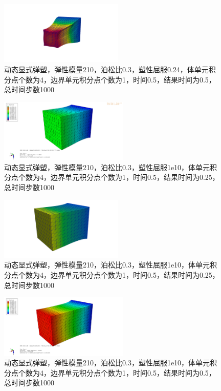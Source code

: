 \begin{figure}[!htbp]
  \centering
  \includegraphics[height=3cm]{fig/4/4.1.5/4-1.png}
  \caption{动态显式弹塑，弹性模量210，泊松比0.3，塑性屈服0.24，体单元积分点个数为4，边界单元积分点个数为1，时间0.5，结果时间为0.5，总时间步数1000}
  \label{fig:4.1.4:4}
\end{figure}

\begin{figure}[!htbp]
  \centering
  \includegraphics[height=3cm]{fig/4/4.1.5/5.png}
  \caption{动态显式弹塑，弹性模量210，泊松比0.3，塑性屈服1e10，体单元积分点个数为4，边界单元积分点个数为1，时间0.5，结果时间为0.25，总时间步数1000}
  \label{fig:4.1.4:4}
\end{figure}

\begin{figure}[!htbp]
  \centering
  \includegraphics[height=3cm]{fig/4/4.1.5/5-1.png}
  \caption{动态显式弹塑，弹性模量210，泊松比0.3，塑性屈服1e10，体单元积分点个数为4，边界单元积分点个数为1，时间0.5，结果时间为0.25，总时间步数1000}
  \label{fig:4.1.4:4}
\end{figure}

\begin{figure}[!htbp]
  \centering
  \includegraphics[height=3cm]{fig/4/4.1.5/6.png}
  \caption{动态显式弹塑，弹性模量210，泊松比0.3，塑性屈服1e10，体单元积分点个数为4，边界单元积分点个数为1，时间0.5，结果时间为0.5，总时间步数1000}
  \label{fig:4.1.4:4}
\end{figure}

